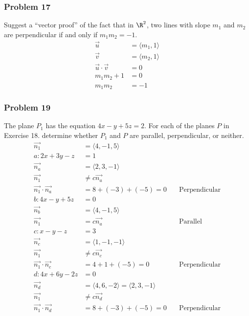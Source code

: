 \documentclass[letterpaper, 12pt]{math}
\begin{document}
\subsubsection*{Problem 17}
Suggest a ``vector proof'' of the fact that in \( \R^2 \), two lines with slope
\( m_1 \) and \( m_2 \) are perpendicular if and only if \( m_1m_2 = -1 \).
\begin{align*}
  \vec{u} &= \langle m_1,1\rangle \\
  \vec{v} &= \langle m_2,1\rangle \\
  \vec{u}\cdot\vec{v} &= 0 \\
  m_1m_2+1 &= 0 \\
  m_1m_2 &= -1
\end{align*}

\subsubsection*{Problem 19}
The plane \( P_1 \) has the equation \( 4x-y+5z = 2 \). For each
of the planes \( P \) in Exercise 18. determine whether \( P_1 \) and \( P \)
are parallel, perpendicular, or neither.
\begin{align*}
  \vec{n_1} &= \langle4,-1,5\rangle \\
  a: 2x+3y-z &= 1 \\
  \vec{n_a} &= \langle2,3,-1\rangle \\
  \vec{n_1} &\ne c\vec{n_a} \\
  \vec{n_1}\cdot\vec{n_a} &= 8+(-3)+(-5) = 0 \quad &\text{Perpendicular} \\
  b: 4x-y+5z &= 0 \\
  \vec{n_b} &= \langle4,-1,5\rangle \\
  \vec{n_1} &= c\vec{n_a} \quad &\text{Parallel} \\
  c: x-y-z &= 3 \\
  \vec{n_c} &= \langle1,-1,-1\rangle \\
  \vec{n_1} &\ne c\vec{n_c} \\
  \vec{n_1}\cdot\vec{n_c} &= 4+1+(-5) = 0 \quad &\text{Perpendicular} \\
  d: 4x+6y-2z &= 0 \\
  \vec{n_d} &= \langle4,6,-2\rangle = \langle2,3,-1\rangle \\
  \vec{n_1} &\ne c\vec{n_d} \\
  \vec{n_1}\cdot\vec{n_d} &= 8+(-3)+(-5) = 0 \quad &\text{Perpendicular}
\end{align*}
\end{document}
